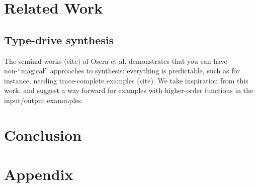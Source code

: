 \documentclass[acmsmall]{acmart}
\theoremstyle{mytheoremstyle}
\begin{document}
\section{Related Work}

\subsection{Type-drive synthesis}

The seminal works (cite) of Osera et al. demonstrates that you can have non-``magical'' approaches to synthesis: everything is predictable, such as for instance, needing trace-complete examples (cite). We take inspiration from this work, and suggest a way forward for examples with higher-order functions in the input/output exammples.

\section{Conclusion}






\newpage
\section{Appendix}
\end{document}
